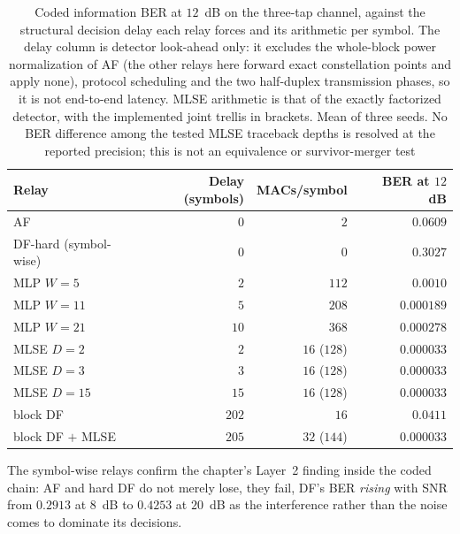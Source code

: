 \begin{table}[htbp]
\centering
\caption[Relay cost and accuracy under a latency constraint]{Coded information BER at $12$~dB on the three-tap channel, against the structural decision delay each relay forces and its arithmetic per symbol. The delay column is detector look-ahead only: it excludes the whole-block power normalization of AF (the other relays here forward exact constellation points and apply none), protocol scheduling and the two half-duplex transmission phases, so it is not end-to-end latency. MLSE arithmetic is that of the exactly factorized detector, with the implemented joint trellis in brackets. Mean of three seeds. No BER difference among the tested MLSE traceback depths is resolved at the reported precision; this is not an equivalence or survivor-merger test}\label{tbl:joint-latency}
\begin{tabular}{lrrr}
\toprule
Relay & Delay (symbols) & MACs/symbol & BER at $12$~dB \\
\midrule
AF                    & $0$   & $2$   & $0.0609$ \\
DF-hard (symbol-wise) & $0$   & $0$   & $0.3027$ \\
MLP $W=5$             & $2$   & $112$ & $0.0010$ \\
MLP $W=11$            & $5$   & $208$ & $0.000189$ \\
MLP $W=21$            & $10$  & $368$ & $0.000278$ \\
MLSE $D=2$            & $2$   & $16$ ($128$) & $\mathbf{0.000033}$ \\
MLSE $D=3$            & $3$   & $16$ ($128$) & $\mathbf{0.000033}$ \\
MLSE $D=15$           & $15$  & $16$ ($128$) & $\mathbf{0.000033}$ \\
block DF              & $202$ & $16$  & $0.0411$ \\
block DF $+$ MLSE     & $205$ & $32$ ($144$) & $0.000033$ \\
\bottomrule
\end{tabular}
\end{table}

The symbol-wise relays confirm the chapter's Layer~2 finding inside the coded chain: AF and hard DF do not merely lose, they fail, DF's BER \emph{rising} with SNR from $0.2913$ at $8$~dB to $0.4253$ at $20$~dB as the interference rather than the noise comes to dominate its decisions.

